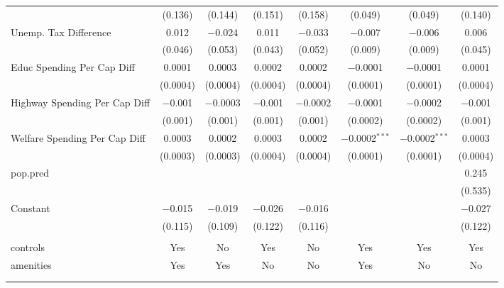 \begin{table}[!htbp]
\begin{tabular}{@{\extracolsep{5pt}}lccccccc}
  & (0.136) & (0.144) & (0.151) & (0.158) & (0.049) & (0.049) & (0.140) \\ 
  Unemp. Tax Difference & 0.012 & $-$0.024 & 0.011 & $-$0.033 & $-$0.007 & $-$0.006 & 0.006 \\ 
  & (0.046) & (0.053) & (0.043) & (0.052) & (0.009) & (0.009) & (0.045) \\ 
  Educ Spending Per Cap Diff & 0.0001 & 0.0003 & 0.0002 & 0.0002 & $-$0.0001 & $-$0.0001 & 0.0001 \\ 
  & (0.0004) & (0.0004) & (0.0004) & (0.0004) & (0.0001) & (0.0001) & (0.0004) \\ 
  Highway Spending Per Cap Diff & $-$0.001 & $-$0.0003 & $-$0.001 & $-$0.0002 & $-$0.0001 & $-$0.0002 & $-$0.001 \\ 
  & (0.001) & (0.001) & (0.001) & (0.001) & (0.0002) & (0.0002) & (0.001) \\ 
  Welfare Spending Per Cap Diff & 0.0003 & 0.0002 & 0.0003 & 0.0002 & $-$0.0002$^{***}$ & $-$0.0002$^{***}$ & 0.0003 \\ 
  & (0.0003) & (0.0003) & (0.0004) & (0.0004) & (0.0001) & (0.0001) & (0.0004) \\ 
  pop.pred &  &  &  &  &  &  & 0.245 \\ 
  &  &  &  &  &  &  & (0.535) \\ 
  Constant & $-$0.015 & $-$0.019 & $-$0.026 & $-$0.016 &  &  & $-$0.027 \\ 
  & (0.115) & (0.109) & (0.122) & (0.116) &  &  & (0.122) \\ 
 \hline \\[-1.8ex] 
controls & Yes & No & Yes & No & Yes & Yes & Yes \\ 
amenities & Yes & Yes & No & No & Yes & No & No \\ 
\hline \\[-1.8ex] 
\hline 
\hline \\[-1.8ex] 
\end{tabular} 
\end{table} 
